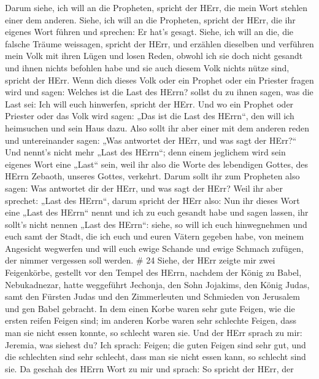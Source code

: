 Darum siehe, ich will an die Propheten, spricht der HErr, die mein Wort
stehlen einer dem anderen.  Siehe, ich will an die
Propheten, spricht der HErr, die ihr eigenes Wort führen und sprechen:
Er hat's gesagt.  Siehe, ich will an die, die falsche
Träume weissagen, spricht der HErr, und erzählen dieselben und verführen
mein Volk mit ihren Lügen und losen Reden, obwohl ich sie doch nicht
gesandt und ihnen nichts befohlen habe und sie auch diesem Volk nichts
nütze sind, spricht der HErr.  Wenn dich dieses Volk oder
ein Prophet oder ein Priester fragen wird und sagen: Welches ist die
Last des HErrn? sollst du zu ihnen sagen, was die Last sei: Ich will
euch hinwerfen, spricht der HErr.  Und wo ein Prophet oder
Priester oder das Volk wird sagen: „Das ist die Last des HErrn``, den
will ich heimsuchen und sein Haus dazu.  Also sollt ihr
aber einer mit dem anderen reden und untereinander sagen: „Was antwortet
der HErr, und was sagt der HErr?{}``  Und nennt's nicht
mehr „Last des HErrn``; denn einem jeglichem wird sein eigenes Wort eine
„Last`` sein, weil ihr also die Worte des lebendigen Gottes, des HErrn
Zebaoth, unseres Gottes, verkehrt.  Darum sollt ihr zum
Propheten also sagen: Was antwortet dir der HErr, und was sagt der HErr?
 Weil ihr aber sprechet: „Last des HErrn``, darum spricht
der HErr also: Nun ihr dieses Wort eine „Last des HErrn`` nennt und ich
zu euch gesandt habe und sagen lassen, ihr sollt's nicht nennen „Last
des HErrn``:  siehe, so will ich euch hinwegnehmen und euch
samt der Stadt, die ich euch und euren Vätern gegeben habe, von meinem
Angesicht wegwerfen  und will euch ewige Schande und ewige
Schmach zufügen, der nimmer vergessen soll werden. \# 24 
Siehe, der HErr zeigte mir zwei Feigenkörbe, gestellt vor den Tempel des
HErrn, nachdem der König zu Babel, Nebukadnezar, hatte weggeführt
Jechonja, den Sohn Jojakims, den König Judas, samt den Fürsten Judas und
den Zimmerleuten und Schmieden von Jerusalem und gen Babel gebracht.
 In dem einen Korbe waren sehr gute Feigen, wie die ersten
reifen Feigen sind; im anderen Korbe waren sehr schlechte Feigen, dass
man sie nicht essen konnte, so schlecht waren sie.  Und der
HErr sprach zu mir: Jeremia, was siehest du? Ich sprach: Feigen; die
guten Feigen sind sehr gut, und die schlechten sind sehr schlecht, dass
man sie nicht essen kann, so schlecht sind sie.  Da geschah
des HErrn Wort zu mir und sprach:  So spricht der HErr, der
